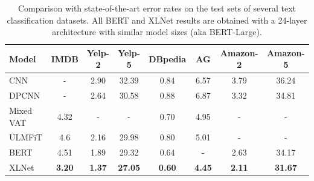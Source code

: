 \begin{table}[!h]
  \small
  \centering
  
  \begin{tabular}{lccccccc}
    \toprule
    \bf Model & \bf IMDB & \bf Yelp-2& \bf Yelp-5 & \bf DBpedia & \bf AG & \bf Amazon-2 & \bf Amazon-5 \\
    \midrule
    CNN \cite{johnson2017deep} & - & 2.90 & 32.39 & 0.84 & 6.57 & 3.79 & 36.24 \\
    DPCNN \cite{johnson2017deep} & - & 2.64 & 30.58 & 0.88 & 6.87 & 3.32 & 34.81 \\
    Mixed VAT \cite{sachan2018revisiting,miyato2016adversarial} & 4.32 & - & - & 0.70 & 4.95 & - & - \\
    ULMFiT \cite{howard2018universal} & 4.6 & 2.16 & 29.98 & 0.80 & 5.01 & - & - \\
    BERT \cite{uda2019} & 4.51 & 1.89 & 29.32 & 0.64 & - & 2.63 & 34.17 \\
    \midrule
    XLNet & \bf 3.20 & \bf 1.37 & \bf 27.05 & \bf 0.60 & \bf 4.45 & \bf 2.11 & \bf 31.67 \\
    \bottomrule
  \end{tabular}
  \caption{\small
    Comparison with state-of-the-art error rates on the test sets of several text classification datasets. All BERT and XLNet results are obtained with a 24-layer architecture with similar model sizes (aka BERT-Large).
  }
  \label{tab:txtcls}
\end{table}

